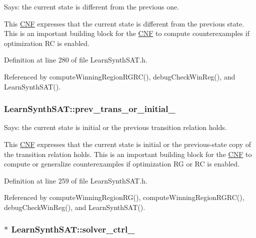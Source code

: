 Says\-: the current state is different from the previous one. 

This \hyperlink{classCNF}{C\-N\-F} expresses that the current state is different from the previous state. This is an important building block for the \hyperlink{classCNF}{C\-N\-F} to compute counterexamples if optimization R\-C is enabled. 

Definition at line 280 of file Learn\-Synth\-S\-A\-T.\-h.



Referenced by compute\-Winning\-Region\-R\-G\-R\-C(), debug\-Check\-Win\-Reg(), and Learn\-Synth\-S\-A\-T().

\hypertarget{classLearnSynthSAT_a6289a4f041ca85ce44a33143fab42888}{
\subsubsection[{prev\-\_\-trans\-\_\-or\-\_\-initial\-\_\-}]{ Learn\-Synth\-S\-A\-T\-::prev\-\_\-trans\-\_\-or\-\_\-initial\-\_\-\hspace{0.3cm}{\ttfamily [protected]}}}\label{classLearnSynthSAT_a6289a4f041ca85ce44a33143fab42888}


Says\-: the current state is initial or the previous transition relation holds. 

This \hyperlink{classCNF}{C\-N\-F} expresses that the current state is initial or the previous-\/state copy of the transition relation holds. This is an important building block for the \hyperlink{classCNF}{C\-N\-F} to compute or generalize counterexamples if optimization R\-G or R\-C is enabled. 

Definition at line 259 of file Learn\-Synth\-S\-A\-T.\-h.



Referenced by compute\-Winning\-Region\-R\-G(), compute\-Winning\-Region\-R\-G\-R\-C(), debug\-Check\-Win\-Reg(), and Learn\-Synth\-S\-A\-T().

\hypertarget{classLearnSynthSAT_abb28d64291205442f1df055049ef0195}{
\subsubsection[{solver\-\_\-ctrl\-\_\-}]{$\ast$ Learn\-Synth\-S\-A\-T\-::solver\-\_\-ctrl\-\_\-\hspace{0.3cm}{\ttfamily [protected]}}}\label{classLearnSynthSAT_abb28d64291205442f1df055049ef0195}


